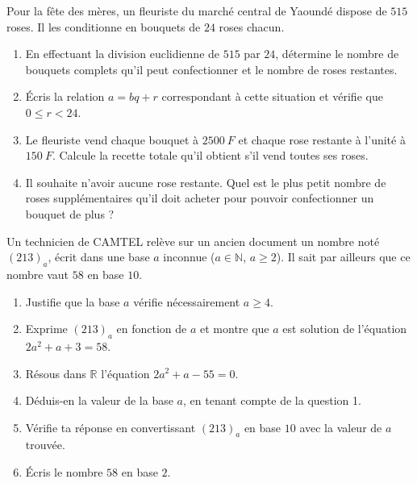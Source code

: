 \documentclass[11pt]{article}
\begin{document}
\begin{exercice}
Pour la fête des mères, un fleuriste du marché central de Yaoundé dispose de $515$ roses. Il les conditionne en bouquets de $24$ roses chacun.
\begin{enumerate}
\item En effectuant la division euclidienne de $515$ par $24$, détermine le nombre de bouquets complets qu'il peut confectionner et le nombre de roses restantes.
\item Écris la relation $a = bq + r$ correspondant à cette situation et vérifie que $0 \le r < 24$.
\item Le fleuriste vend chaque bouquet à $\SI{2500}{F}$ et chaque rose restante à l'unité à $\SI{150}{F}$. Calcule la recette totale qu'il obtient s'il vend toutes ses roses.
\item Il souhaite n'avoir aucune rose restante. Quel est le plus petit nombre de roses supplémentaires qu'il doit acheter pour pouvoir confectionner un bouquet de plus ?
\end{enumerate}
\end{exercice}

\begin{exercice}
Un technicien de CAMTEL relève sur un ancien document un nombre noté $(213)_a$, écrit dans une base $a$ inconnue ($a \in \mathbb{N}$, $a \ge 2$). Il sait par ailleurs que ce nombre vaut $58$ en base $10$.
\begin{enumerate}
\item Justifie que la base $a$ vérifie nécessairement $a \ge 4$.
\item Exprime $(213)_a$ en fonction de $a$ et montre que $a$ est solution de l'équation $2a^2 + a + 3 = 58$.
\item Résous dans $\mathbb{R}$ l'équation $2a^2 + a - 55 = 0$.
\item Déduis-en la valeur de la base $a$, en tenant compte de la question 1.
\item Vérifie ta réponse en convertissant $(213)_a$ en base $10$ avec la valeur de $a$ trouvée.
\item Écris le nombre $58$ en base $2$.
\end{enumerate}
\end{exercice}
\end{document}
